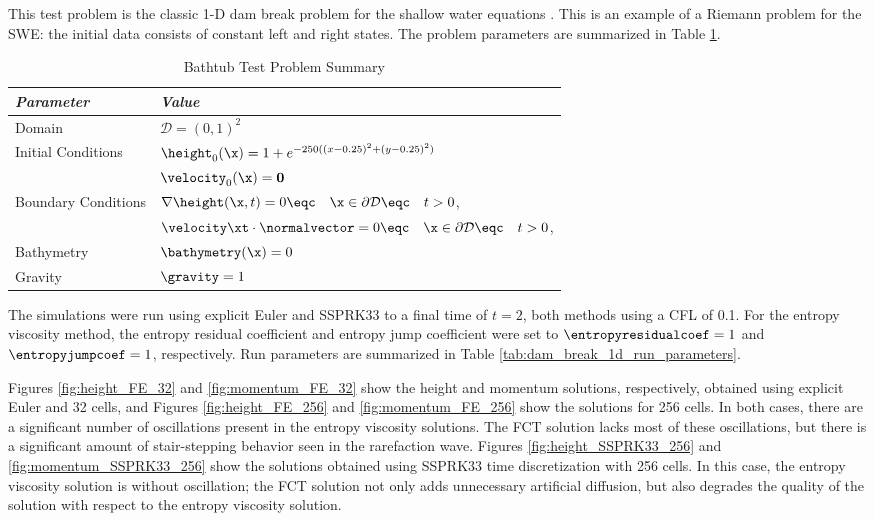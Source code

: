 This test problem is the classic 1-D dam break problem for the shallow
water equations \cite{leveque2002}. This is an example of a Riemann problem
for the SWE: the initial data consists of constant left and right states.
The problem parameters are summarized in Table \ref{tab:dam_break_1d}.

\begin{table}[htb]\caption{Bathtub Test Problem Summary}
\label{tab:dam_break_1d}
\centering
\begin{tabular}{l l}\toprule
\emph{Parameter} & \emph{Value}\\\midrule
Domain & $\mathcal{D} = (0,1)^2$\\
Initial Conditions & $\height_0(\x)=1 + e^{-250((x-0.25)^2+(y-0.25)^2)}$\\
                   & $\velocity_0(\x) = \mathbf{0}$\\
Boundary Conditions & $\nabla\height(\x,t)=0
  \eqc \quad \x\in\partial\mathcal{D}\eqc \quad t>0$,\\
                    & $\velocity\xt\cdot\normalvector = 0
  \eqc \quad \x\in\partial\mathcal{D}\eqc \quad t>0$,\\
Bathymetry & $\bathymetry(\x)=0$\\
Gravity    & $\gravity=1$\\
\bottomrule\end{tabular}
\end{table}

The simulations were run using explicit Euler and SSPRK33
to a final time of $t=2$, both methods using a CFL of 0.1.
For the entropy viscosity method, the entropy residual coefficient
and entropy jump coefficient were set to $\entropyresidualcoef=1$
and $\entropyjumpcoef=1$, respectively.
Run parameters are summarized in Table \ref{tab:dam_break_1d_run_parameters}.

Figures \ref{fig:height_FE_32} and \ref{fig:momentum_FE_32} 
show the height and momentum solutions, respectively, obtained using explicit Euler
and 32 cells, and Figures \ref{fig:height_FE_256} and \ref{fig:momentum_FE_256} 
show the solutions for 256 cells. In both cases, there are a significant number of
oscillations present in the entropy viscosity solutions. The FCT solution lacks
most of these oscillations, but there is a significant amount of stair-stepping
behavior seen in the rarefaction wave.
Figures \ref{fig:height_SSPRK33_256} and \ref{fig:momentum_SSPRK33_256} show
the solutions obtained using SSPRK33 time discretization with 256 cells.
In this case, the entropy viscosity solution is without oscillation; the
FCT solution not only adds unnecessary artificial diffusion, but also degrades
the quality of the solution with respect to the entropy viscosity solution.

